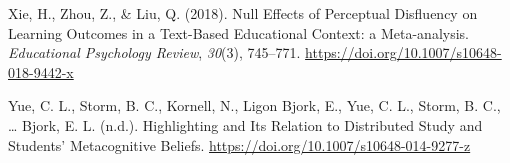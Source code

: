 \documentclass[english,doc]{apa6}
\begin{document}
\leavevmode\hypertarget{ref-Xie2018}{}%
Xie, H., Zhou, Z., \& Liu, Q. (2018). Null Effects of Perceptual Disfluency on Learning Outcomes in a Text-Based Educational Context: a Meta-analysis. \emph{Educational Psychology Review}, \emph{30}(3), 745--771. \url{https://doi.org/10.1007/s10648-018-9442-x}

\leavevmode\hypertarget{ref-Yue}{}%
Yue, C. L., Storm, B. C., Kornell, N., Ligon Bjork, E., Yue, C. L., Storm, B. C., \ldots{} Bjork, E. L. (n.d.). Highlighting and Its Relation to Distributed Study and Students' Metacognitive Beliefs. \url{https://doi.org/10.1007/s10648-014-9277-z}

\endgroup
\end{document}
